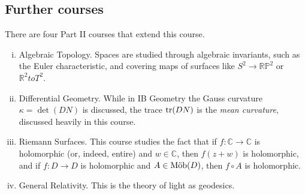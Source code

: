 \subsection{Further courses}
There are four Part II courses that extend this course.
\begin{enumerate}[(i)]
	\item Algebraic Topology. Spaces are studied through algebraic invariants, such as the Euler characteristic, and covering maps of surfaces like \( S^2 \to \mathbb R \mathbb P^2 \) or \( \mathbb R^2 to T^2 \).
	\item Differential Geometry. While in IB Geometry the Gauss curvature \( \kappa = \det (DN) \) is discussed, the trace \( \tr (DN) \) is the \textit{mean curvature}, discussed heavily in this course.
	\item Riemann Surfaces. This course studies the fact that if \( f \colon \mathbb C \to \mathbb C \) is holomorphic (or, indeed, entire) and \( w \in \mathbb C \), then \( f(z+w) \) is holomorphic, and if \( f \colon D \to D \) is holomorphic and \( A \in \text{M\"ob}(D) \), then \( f \circ A \) is holomorphic.
	\item General Relativity. This is the theory of light as geodesics.
\end{enumerate}
